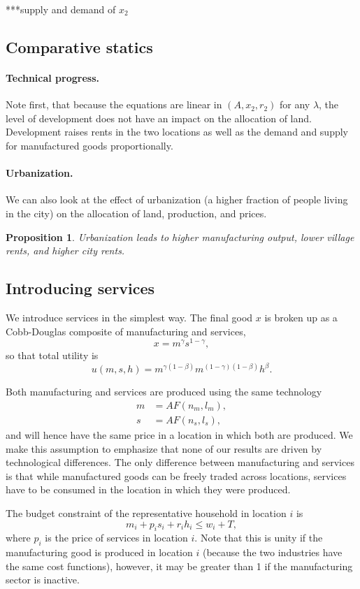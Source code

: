 \documentclass[12pt]{article}
\newtheorem{proposition}{Proposition}
\begin{document}
***supply and demand of $x_2$

\subsection{Comparative statics}
\paragraph{Technical progress.}
Note first, that because the equations are linear in $(A,x_2,r_2)$ for any ${\lambda}$, the level of development does not have an impact on the allocation of land. Development raises rents in the two locations as well as the demand and supply for manufactured goods proportionally.

\paragraph{Urbanization.} 
We can also look at the effect of urbanization (a higher fraction of people living in the city) on the allocation of land, production, and prices.

\begin{proposition}
Urbanization leads to higher manufacturing output, lower village rents, and higher city rents.
\end{proposition}

\subsection{Introducing services}
We introduce services in the simplest way. The final good $x$ is broken up as a Cobb-Douglas composite of manufacturing and services,
\[
x = m^\gamma s^{1-\gamma},
\]
so that total utility is
\[
u(m,s,h) = m^{\gamma(1-\beta)}m^{(1-\gamma)(1-\beta)}h^\beta.
\]

Both manufacturing and services are produced using the same technology 
\begin{align*}
m&=AF(n_m,l_m),\\
s&=AF(n_s,l_s),
\end{align*}
and will hence have the same price in a location in which both are produced. We make this assumption to emphasize that none of our results are driven by technological differences. The only difference between manufacturing and services is that while manufactured goods can be freely traded across locations, services have to be consumed in the location in which they were produced.

The budget constraint of the representative household in location $i$ is
\[
m_i + p_is_i + r_i h_i \le w_i + T,
\]
where $p_i$ is the price of services in location $i$. Note that this is unity if the manufacturing good is produced in location $i$ (because the two industries have the same cost functions), however, it may be greater than 1 if the manufacturing sector is inactive.
\end{document}
